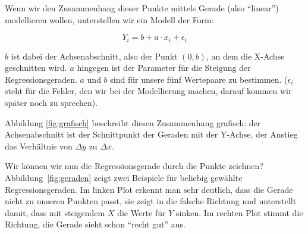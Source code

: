 \documentclass[ngerman, 12pt]{scrartcl}
\begin{document}
Wenn wir den Zusammenhang dieser Punkte mittels Gerade (also \enquote{linear}) modellieren wollen, unterstellen wir ein Modell der Form: 
   
\begin{equation}
	 Y_i = b + a \cdot x_i + \epsilon_i
\end{equation}

\begin{center}
\label{fig:grafisch}
\end{center}

$b$ ist dabei der Achsenabschnitt, also der Punkt $(0,b)$, an dem die X-Achse geschnitten wird. $a$ hingegen ist der Parameter für die Steigung der Regressionsgeraden. $a$ und $b$ sind für unsere fünf Wertepaare zu bestimmen. ($\epsilon_i$ steht für die Fehler, den wir bei der Modellierung machen, darauf kommen wir später noch zu sprechen). 

Abbildung \ref{fig:grafisch} beschreibt diesen Zusammenhang grafisch: der Achsenabschnitt ist der Schnittpunkt der Geraden mit der Y-Achse, der Anstieg das Verhältnis von \(\Delta y\) zu \(\Delta x\).

Wir können wir nun die Regressionsgerade durch die Punkte zeichnen? Abbildung~\ref{fig:geraden} zeigt zwei Beispiele für beliebig gewählte Regressionsgeraden. Im linken Plot erkennt man sehr deutlich, dass die Gerade nicht zu unseren Punkten passt, sie zeigt in die falsche Richtung und unterstellt damit, dass mit steigendem $X$ die Werte für $Y$ sinken. Im rechten Plot stimmt die Richtung, die Gerade sieht schon \enquote{recht gut} aus. 
\end{document}
